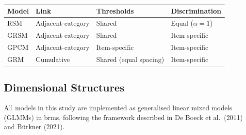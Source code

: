 \documentclass[
  man,
  floatsintext,
  longtable,
  nolmodern,
  notxfonts,
  notimes,
  colorlinks=true,linkcolor=blue,citecolor=blue,urlcolor=blue]{apa7}
\begin{document}
\begin{table}

{\caption{{Summary of ordinal IRT model families used in this study.
RSM, GRSM, and GRM share threshold spacing across items; item
differences enter only through the location parameter \(\xi_i\). GPCM
allows fully item-specific thresholds. The generalised forms (GRSM,
GPCM, GRM) estimate item-specific discrimination.}{\label{tbl-models}}}
\vspace{-20pt}}

\begin{longtable}[]{@{}
  >{\raggedright\arraybackslash}p{}
  >{\raggedright\arraybackslash}p{}
  >{\raggedright\arraybackslash}p{}
  >{\raggedright\arraybackslash}p{}@{}}
\toprule\noalign{}
\begin{minipage}[b]{\linewidth}\raggedright
Model
\end{minipage} & \begin{minipage}[b]{\linewidth}\raggedright
Link
\end{minipage} & \begin{minipage}[b]{\linewidth}\raggedright
Thresholds
\end{minipage} & \begin{minipage}[b]{\linewidth}\raggedright
Discrimination
\end{minipage} \\
\midrule\noalign{}
\endhead
\bottomrule\noalign{}
\endlastfoot
RSM & Adjacent-category & Shared & Equal (\(\alpha = 1\)) \\
GRSM & Adjacent-category & Shared & Item-specific \\
GPCM & Adjacent-category & Item-specific & Item-specific \\
GRM & Cumulative & Shared (equal spacing) & Item-specific \\
\end{longtable}

\end{table}

\normalsize

\subsection{Dimensional Structures}\label{dimensional-structures}

All models in this study are implemented as generalised linear mixed
models (GLMMs) in brms, following the framework described in De Boeck et
al.~(2011) and Bürkner (2021).
\end{document}
